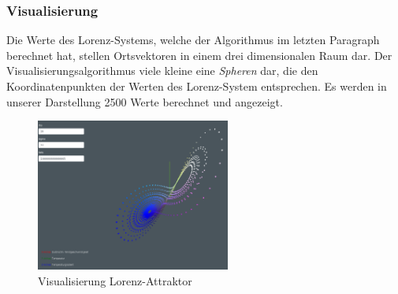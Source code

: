 \subsubsection{Visualisierung}
Die Werte des Lorenz-Systems, welche der Algorithmus im letzten Paragraph berechnet hat, stellen Ortsvektoren in einem drei dimensionalen Raum dar. Der Visualisierungsalgorithmus viele kleine eine \textit{Spheren} dar, die den Koordinatenpunkten der Werten des Lorenz-System entsprechen. Es werden in unserer Darstellung 2500 Werte berechnet und angezeigt.

\begin{figure}
	\centering	\includegraphics[height=5cm]{lorenz/assets/implementation/Visualisierung}
	\caption{Visualisierung Lorenz-Attraktor}
	\label{fig:visualisierung}
\end{figure}
